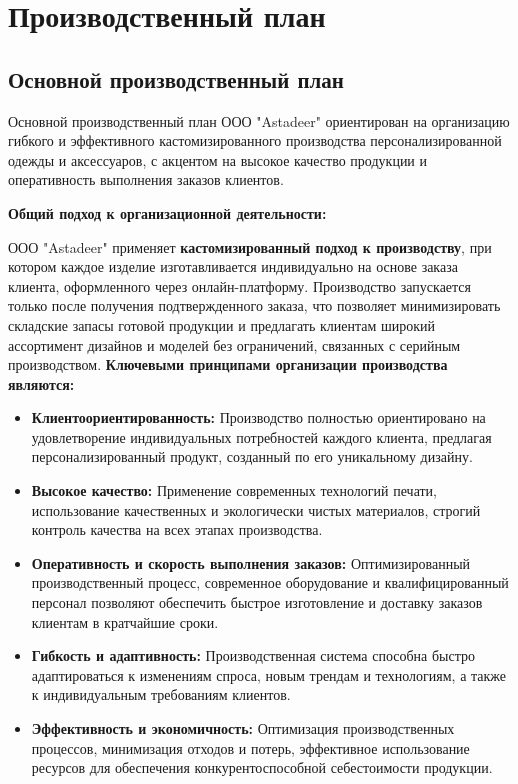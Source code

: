 \section{Производственный план}

\subsection{Основной производственный план}

Основной производственный план ООО "Astadeer" ориентирован на организацию гибкого и эффективного кастомизированного производства персонализированной одежды и аксессуаров, с акцентом на высокое качество продукции и оперативность выполнения заказов клиентов.

\vspace{0.3cm}

\textbf{Общий подход к организационной деятельности:}

ООО "Astadeer" применяет \textbf{кастомизированный подход к производству}, при котором каждое изделие изготавливается индивидуально на основе заказа клиента, оформленного через онлайн-платформу.  Производство запускается только после получения подтвержденного заказа, что позволяет минимизировать складские запасы готовой продукции и предлагать клиентам широкий ассортимент дизайнов и моделей без ограничений, связанных с серийным производством.  \textbf{Ключевыми принципами организации производства являются:}

\begin{itemize}
    \item \textbf{Клиентоориентированность:}  Производство полностью ориентировано на удовлетворение индивидуальных потребностей каждого клиента, предлагая персонализированный продукт, созданный по его уникальному дизайну.
    \item \textbf{Высокое качество:}  Применение современных технологий печати, использование качественных и экологически чистых материалов, строгий контроль качества на всех этапах производства.
    \item \textbf{Оперативность и скорость выполнения заказов:}  Оптимизированный производственный процесс, современное оборудование и квалифицированный персонал позволяют обеспечить быстрое изготовление и доставку заказов клиентам в кратчайшие сроки.
    \item \textbf{Гибкость и адаптивность:}  Производственная система способна быстро адаптироваться к изменениям спроса, новым трендам и технологиям, а также к индивидуальным требованиям клиентов.
    \item \textbf{Эффективность и экономичность:}  Оптимизация производственных процессов, минимизация отходов и потерь, эффективное использование ресурсов для обеспечения конкурентоспособной себестоимости продукции.
\end{itemize}

